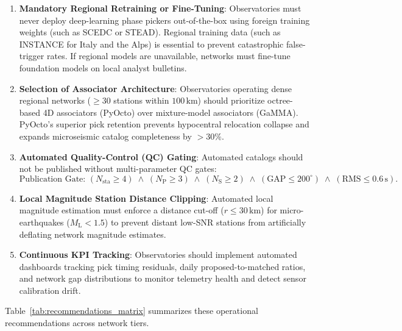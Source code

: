 \begin{enumerate}
  \item \textbf{Mandatory Regional Retraining or Fine-Tuning}: Observatories must never deploy deep-learning phase pickers out-of-the-box using foreign training weights (such as SCEDC or STEAD). Regional training data (such as INSTANCE for Italy and the Alps) is essential to prevent catastrophic false-trigger rates. If regional models are unavailable, networks must fine-tune foundation models on local analyst bulletins.
  \item \textbf{Selection of Associator Architecture}: Observatories operating dense regional networks ($\ge 30$ stations within $100\,\unit{\kilo\meter}$) should prioritize octree-based 4D associators (\ac{PyOcto}) over mixture-model associators (\ac{GaMMA}). PyOcto's superior pick retention prevents hypocentral relocation collapse and expands microseismic catalog completeness by $>30\%$.
  \item \textbf{Automated Quality-Control (QC) Gating}: Automated catalogs should not be published without multi-parameter QC gates:
  \begin{equation}
    \text{Publication Gate: } \left( N_{\mathrm{sta}} \ge 4 \right) \;\land\; \left( N_{\mathrm{P}} \ge 3 \right) \;\land\; \left( N_{\mathrm{S}} \ge 2 \right) \;\land\; \left( \mathrm{GAP} \le 200^\circ \right) \;\land\; \left( \mathrm{RMS} \le 0.6\,\unit{\second} \right).
  \end{equation}
  \item \textbf{Local Magnitude Station Distance Clipping}: Automated local magnitude estimation must enforce a distance cut-off ($r \le 30\,\unit{\kilo\meter}$) for micro-earthquakes ($M_{\mathrm{L}} < 1.5$) to prevent distant low-SNR stations from artificially deflating network magnitude estimates.
  \item \textbf{Continuous KPI Tracking}: Observatories should implement automated dashboards tracking pick timing residuals, daily proposed-to-matched ratios, and network gap distributions to monitor telemetry health and detect sensor calibration drift.
\end{enumerate}

Table~\ref{tab:recommendations_matrix} summarizes these operational recommendations across network tiers.


